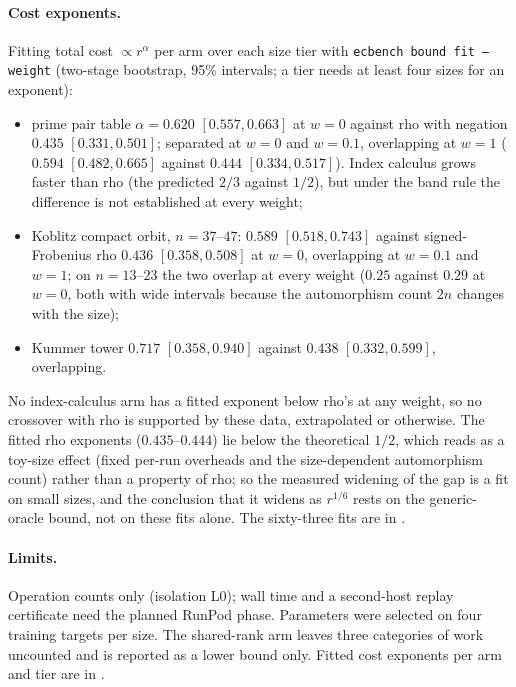 \paragraph{Cost exponents.} Fitting total cost $\propto r^{\alpha}$ per
arm over each size tier with \texttt{ecbench bound fit --weight}
(two-stage bootstrap, 95\% intervals; a tier needs at least four sizes for
an exponent):
\begin{itemize}
\item prime pair table $\alpha=0.620$ $[0.557,0.663]$ at $w=0$ against
  rho with negation $0.435$ $[0.331,0.501]$; separated at $w=0$ and
  $w=0.1$, overlapping at $w=1$ ($0.594$ $[0.482,0.665]$ against $0.444$
  $[0.334,0.517]$). Index calculus grows faster than rho (the predicted
  $2/3$ against $1/2$), but under the band rule the difference is not
  established at every weight;
\item Koblitz compact orbit, $n=37$--$47$: $0.589$ $[0.518,0.743]$ against
  signed-Frobenius rho $0.436$ $[0.358,0.508]$ at $w=0$, overlapping at
  $w=0.1$ and $w=1$; on $n=13$--$23$ the two overlap at every weight
  ($0.25$ against $0.29$ at $w=0$, both with wide intervals because the
  automorphism count $2n$ changes with the size);
\item Kummer tower $0.717$ $[0.358,0.940]$ against $0.438$
  $[0.332,0.599]$, overlapping.
\end{itemize}
No index-calculus arm has a fitted exponent below rho's at any weight, so
no crossover with rho is supported by these data, extrapolated or
otherwise. The fitted rho exponents ($0.435$--$0.444$) lie below the
theoretical $1/2$, which reads as a toy-size effect (fixed per-run overheads
and the size-dependent automorphism count) rather than a property of rho; so
the measured widening of the gap is a fit on small sizes, and the conclusion
that it widens as $r^{1/6}$ rests on the generic-oracle bound, not on these
fits alone. The sixty-three fits are in
.

\paragraph{Limits.} Operation counts only (isolation L0); wall time and a
second-host replay certificate need the planned RunPod phase. Parameters
were selected on four training targets per size. The shared-rank arm
leaves three categories of work uncounted and is reported as a lower
bound only. Fitted cost exponents per arm and tier are in
.

